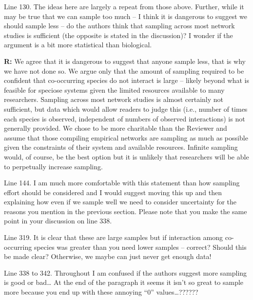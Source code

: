 \documentclass[12pt]{letter}
\newenvironment{refquote}{\bigskip \begin{it}}{\end{it}\smallskip}
\begin{document}
		\begin{refquote}
		Line 130.  The ideas here are largely a repeat from those above.  Further, while it may be true that we can sample too much – I think it is dangerous to suggest we should sample less – do the authors think that sampling across most network studies is sufficient (the opposite is stated in the discussion)?  I wonder if the argument is a bit more statistical than biological.
		\end{refquote}

		\textbf{R:} We agree that it is dangerous to suggest that anyone sample less, that is why we have not done so. We argue only that the amount of sampling required to be confident that co-occurring species do not interact is large -- likely beyond what is feasible for speciose systems given the limited resources available to many researchers. Sampling across most network studies is almost certainly not sufficient, but data which would allow readers to judge this (i.e., number of times each species is observed, independent of numbers of observed interactions) is not generally provided. We chose to be more charitable than the Reviewer and assume that those compiling empirical networks are sampling as much as possible given the constraints of their system and available resources. Infinite sampling would, of course, be the best option but it is unlikely that researchers will be able to perpetually increase sampling.

		\begin{refquote}
		Line 144.  I am much more comfortable with this statement than how sampling effort should be considered and I would suggest moving this up and then explaining how even if we sample well we need to consider uncertainty for the reasons you mention in the previous section.  Please note that you make the same point in your discussion on line 338.
		\end{refquote}


		\begin{refquote}
		Line 319.  It is clear that these are large samples but if interaction among co-occurring species was greater than you need lower samples – correct?  Should this be made clear?  Otherwise, we maybe can just never get enough data!
		\end{refquote}

		\begin{refquote}
		Line 338 to 342.  Throughout I am confused if the authors suggest more sampling is good or bad…  At the end of the paragraph it seems it isn’t so great to sample more because you end up with these annoying “0” values…??????
		\end{refquote}
\end{document}
